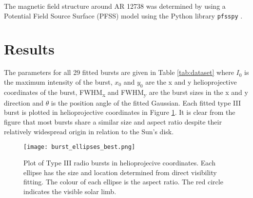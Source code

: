 The magnetic field structure around AR 12738 was determined by using a Potential Field Source Surface (PFSS) model using the Python library \texttt{pfsspy} \citep{Stansby2020}.


\section{Results}
\label{sec:obsvtheory_results}
The parameters for all 29 fitted bursts are given in Table \ref{tab:dataset} where $I_0$ is the maximum intensity of the burst, $x_0$ and $y_0$ are the x and y  helioprojective coordinates of the burst, FWHM\textsubscript{x} and FWHM\textsubscript{y} are the burst sizes in the x and y direction and $\theta$ is the position angle of the fitted Gaussian. Each fitted type III burst is plotted in helioprojective coordinates in Figure \ref{fig:burst_overlay}. It is clear from the figure that most bursts share a similar size and aspect ratio despite their relatively widespread origin in relation to the Sun's disk.

\begin{figure}[ht]
\centering
\texttt{[image: burst\_ellipses\_best.png]}
\caption[Plot of Type III radio bursts in helioprojecive coordinates.]{Plot of Type III radio bursts in helioprojecive coordinates. Each ellipse has the size and location determined from direct visibility fitting. The colour of each ellipse is the aspect ratio. The red circle indicates the visible solar limb. }
\label{fig:burst_overlay}
\end{figure}


